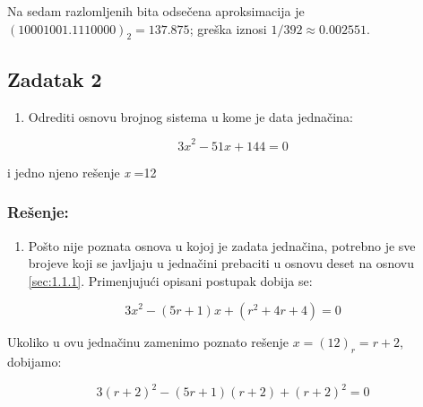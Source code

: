 \documentclass[a4paper,11pt]{article}
\numberwithin{equation}{section}
\begin{document}
Na sedam razlomljenih bita odsečena aproksimacija je $(10001001.1110000)_2=137.875$; greška iznosi $1/392\approx0.002551$.\par

\FloatBarrier
\subsection{Zadatak 2}\label{sec:2.2}


\begin{enumerate}[label=\alph*),start=1,leftmargin=*]
\item Odrediti osnovu brojnog sistema u kome je data jednačina:

\end{enumerate}


\begin{equation}\label{eq:2.2.1}
{3x}^{2} - 51x + 144 = 0
\end{equation}


i jedno njeno rešenje \emph{x} =12



\subsubsection*{Rešenje:}


\begin{enumerate}[label=\alph*),start=1,leftmargin=*]
\item Pošto nije poznata osnova u kojoj je zadata jednačina, potrebno je sve brojeve koji se javljaju u jednačini prebaciti u osnovu deset na osnovu \ref{sec:1.1.1}. Primenjujući opisani postupak dobija se:

\end{enumerate}


\begin{equation}\label{eq:2.2.2}
{3x}^{2} - (5r + 1)x + (r^{2} + 4r + 4) = 0
\end{equation}


Ukoliko u ovu jednačinu zamenimo poznato rešenje $x=(12)_r=r+2$, dobijamo:



\begin{equation}\label{eq:2.2.3}
{3(r + 2)}^{2} - (5r + 1)(r + 2) + {(r + 2)}^{2} = 0
\end{equation}
\end{document}
